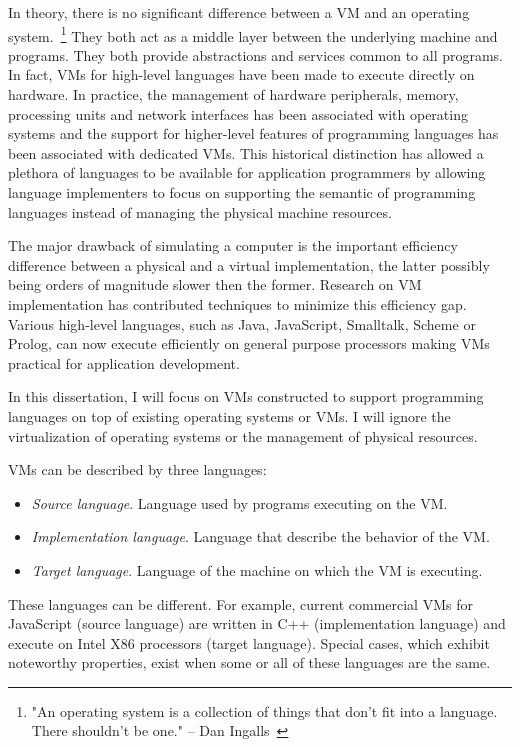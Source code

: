 In theory, there is no significant difference between a VM and
an operating system.~\footnote{"An operating system is a collection of
things that don't fit into a language. There shouldn't be one." -- Dan
Ingalls~\cite{Ingalls1981}} They both act as a middle layer between the
underlying machine and programs. They both provide abstractions and
services common to all programs. In fact, VMs for high-level
languages have been made to execute directly on hardware. In practice, the
management of hardware peripherals, memory, processing units and network
interfaces has been associated with operating systems and the support for
higher-level features of programming languages has been associated with
dedicated VMs. This historical distinction has allowed a plethora
of languages to be available for application programmers by allowing language
implementers to focus on supporting the semantic of programming languages
instead of managing the physical machine resources.

The major drawback of simulating a computer is the important efficiency
difference between a physical and a virtual implementation, the latter possibly
being orders of magnitude slower then the former. Research on VM
implementation has contributed techniques to minimize this efficiency gap.
Various high-level languages, such as Java, JavaScript, Smalltalk, Scheme or
Prolog, can now execute efficiently on general purpose processors making VMs
practical for application development.

In this dissertation, I will focus on VMs constructed to support programming
languages on top of existing operating systems or VMs. I will ignore the
virtualization of operating systems or the management of physical resources.

VMs can be described by three languages:
\begin{itemize}
    \item \textit{Source language}. Language used by programs executing on the VM.
    \item \textit{Implementation language}. Language that describe the behavior of the VM.
    \item \textit{Target language}. Language of the machine on which the VM is executing.
\end{itemize}
These languages can be different. For example, current commercial VMs for
JavaScript (source language) are written in C++ (implementation language) and
execute on Intel X86 processors (target language). Special cases, which exhibit
noteworthy properties, exist when some or all of these languages are the same. 

